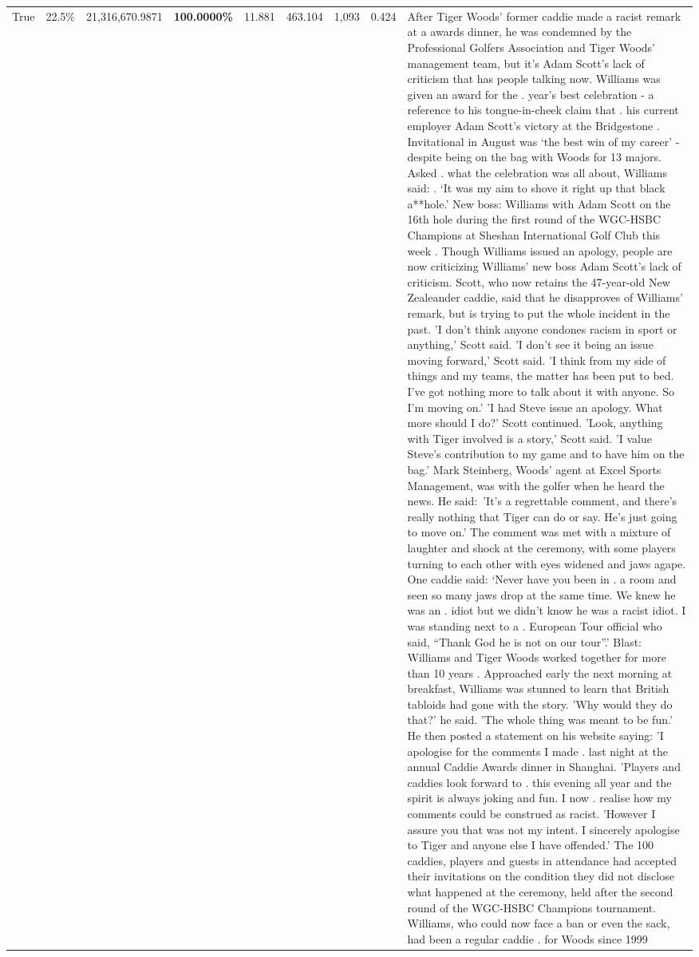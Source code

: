 \begin{table}[H]
\begin{tabular}{lllrlllll}
True & 22.5\% & 21,316,670.9871 & \bfseries \color{red} 100.0000\% & 11.881 & 463.104 & 1,093 & 0.424 & After Tiger Woods' former caddie made a racist remark at a awards dinner, he was condemned by the Professional Golfers Association and Tiger Woods' management team, but it's Adam Scott's lack of criticism that has people talking now. Williams was given an award for the . year’s best celebration - a reference to his tongue-in-cheek claim that . his current employer Adam Scott’s victory at the Bridgestone . Invitational in August was ‘the best win of my career’ - despite being on the bag with Woods for 13 majors. Asked . what the celebration was all about, Williams said: . ‘It was my aim to shove it right up that black a**hole.’ New boss: Williams with Adam Scott  on the 16th hole during the first round of the WGC-HSBC Champions at Sheshan International Golf Club this week . Though Williams issued an apology, people are now criticizing Williams' new boss Adam Scott's lack of criticism. Scott, who now retains the 47-year-old New Zealeander caddie, said that he disapproves of Williams' remark, but is trying to put the whole incident in the past. 'I don't think anyone condones racism in sport or anything,' Scott said. 'I don't see it being an issue moving forward,' Scott said. 'I think from my side of things and my teams, the matter has been put to bed. I've got nothing more to talk about it with anyone. So I'm moving on.' 'I had Steve issue an apology. What more should I do?' Scott continued. 'Look, anything with Tiger involved is a story,' Scott said. 'I value Steve's contribution to my game and to have him on the bag.' Mark Steinberg, Woods' agent at Excel Sports Management, was with the golfer when he heard the news. He said: 'It's a regrettable comment, and there's really nothing that Tiger can do or say. He's just going to move on.' The comment was met with a mixture of laughter and shock at the ceremony, with some players turning to each other with eyes widened and jaws agape. One caddie said: ‘Never have you been in . a room and seen so many jaws drop at the same time. We knew he was an . idiot but we didn’t know he was a racist idiot. I was standing next to a . European Tour official who said, “Thank God he is not on our tour”.’ Blast: Williams and Tiger Woods worked together for more than 10 years . Approached early the next morning at breakfast, Williams was stunned to learn that British tabloids had gone with the story. 'Why would they do that?' he said. 'The whole thing was meant to be fun.' He then posted a statement on his website saying: 'I apologise for the comments I made . last night at the annual Caddie Awards dinner in Shanghai. 'Players and caddies look forward to . this evening all year and the spirit is always joking and fun. I now . realise how my comments could be construed as racist. 'However I assure you that was not my intent. I sincerely apologise to Tiger and anyone else I have offended.' The 100 caddies, players and guests in attendance had accepted their invitations on the condition they did not disclose what happened at the ceremony, held after the second round of the WGC-HSBC Champions tournament. Williams, who could now face a ban or even the sack, had been a regular caddie . for Woods since 1999 
\end{tabular}
\end{table}
